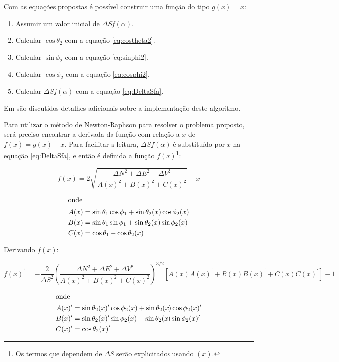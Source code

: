 \documentclass[final,3p,12pt]{elsarticle}
\begin{document}
Com as equações propostas é possível construir uma função do tipo $g(x)=x$:

\begin{enumerate}
    \item Assumir um valor inicial de $\Delta S f(\alpha)$.
    \item Calcular $\cos \theta_2$ com a equação \ref{eq:costheta2}.
    \item Calcular $\sin \phi_2$ com a equação \ref{eq:sinphi2}.
    \item Calcular $\cos \phi_2$ com a equação \ref{eq:cosphi2}.
    \item Calcular $\Delta S f(\alpha)$ com a equação \ref{eq:DeltaSfa}.
\end{enumerate}

Em \cite{relatoriobisseccao} são discutidos detalhes adicionais sobre a implementação deste algoritmo.

Para utilizar o método de Newton-Raphson para resolver o problema proposto, será preciso encontrar a derivada da função com relação a $x$ de $f(x) = g(x) - x$. Para facilitar a leitura, $\Delta S f(\alpha)$ é substituído por $x$ na equação \ref{eq:DeltaSfa}, e então é definida a função $f(x)$\footnote{Os termos que dependem de $\Delta S$ serão explicitados usando $(x)$.}:

\begin{equation} \label{eq:fx}
    f(x) = 2 \sqrt{\frac{\Delta N^2 + \Delta E^2 + \Delta V^2}{A(x)^2+B(x)^2+C(x)^2}} - x
\end{equation}

\begin{align*}
    \intertext{onde}
    A(x) &= \sin \theta_1 \cos \phi_1 + \sin \theta_2(x) \cos \phi_2(x) \\
    B(x) &= \sin \theta_1 \sin \phi_1 + \sin \theta_2(x) \sin \phi_2(x) \\
    C(x) &= \cos \theta_1 + \cos \theta_2(x)
\end{align*}

Derivando $f(x)$:

\begin{equation} \label{eq:fxprime}
    f(x)^{\prime} = - \frac{2}{\Delta S^2} \left( \frac{ \Delta N^2 + \Delta E^2 + \Delta V^2}{A(x)^2+B(x)^2+C(x)^2} \right) ^{3/2} [A(x)A(x)^{\prime}+B(x)B(x)^{\prime}+C(x)C(x)^{\prime}] - 1
\end{equation}

\begin{align*}
    \intertext{onde}
    A(x)^{\prime} &= \sin \theta_2(x)^{\prime} \cos \phi_2(x) + \sin \theta_2(x) \cos \phi_2(x)^{\prime} \\
    B(x)^{\prime} &= \sin \theta_2(x)^{\prime} \sin \phi_2(x) + \sin \theta_2(x) \sin \phi_2(x)^{\prime} \\
    C(x)^{\prime} &= \cos \theta_2(x)^{\prime}
\end{align*}
\end{document}

